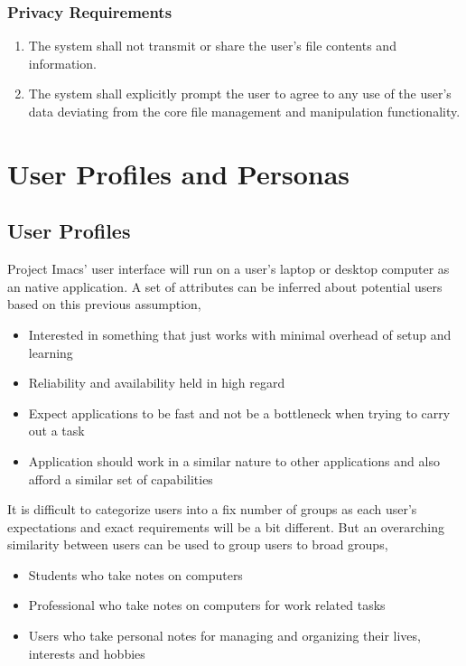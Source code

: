 \documentclass{article}
\begin{document}
\subsubsection{Privacy Requirements}
\begin{enumerate}[PR{I}1]
    \item The system shall not transmit or share the user's file contents and information.
    \item The system shall explicitly prompt the user to agree to any use of the user's data deviating from the core file management and manipulation functionality.
\end{enumerate}

\section{User Profiles and Personas}
\subsection{User Profiles}
Project Imacs' user interface will run on a user's laptop or desktop computer as an
native application. A set of attributes can be inferred about potential users based on
this previous assumption,

\begin{itemize}
    \item Interested in something that just works with minimal overhead of setup and
        learning
    \item Reliability and availability held in high regard
    \item Expect applications to be fast and not be a bottleneck when trying to carry out
        a task
    \item Application should work in a similar nature to other applications and also
        afford a similar set of capabilities
\end{itemize}

It is difficult to categorize users into a fix number of groups as each user's
expectations and exact requirements will be a bit different. But an overarching similarity
between users can be used to group users to broad groups,

\begin{itemize}
    \item Students who take notes on computers
    \item Professional who take notes on computers for work related tasks
    \item Users who take personal notes for managing and organizing their lives, interests
        and hobbies
\end{itemize}
\end{document}
